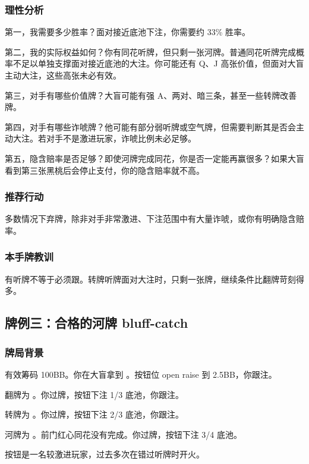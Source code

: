 \subsubsection*{理性分析}

第一，我需要多少胜率？面对接近底池下注，你需要约 33\% 胜率。

第二，我的实际权益如何？你有同花听牌，但只剩一张河牌。普通同花听牌完成概率不足以单独支撑面对接近底池的大注。你可能还有 Q、J 高张价值，但面对大盲主动大注，这些高张未必有效。

第三，对手有哪些价值牌？大盲可能有强 A、两对、暗三条，甚至一些转牌改善牌。

第四，对手有哪些诈唬牌？他可能有部分弱听牌或空气牌，但需要判断其是否会主动大注。若对手不是激进玩家，诈唬比例未必足够。

第五，隐含赔率是否足够？即使河牌完成同花，你是否一定能再赢很多？如果大盲看到第三张黑桃后会停止支付，你的隐含赔率就不高。

\subsubsection*{推荐行动}

多数情况下弃牌，除非对手非常激进、下注范围中有大量诈唬，或你有明确隐含赔率。

\subsubsection*{本手牌教训}

有听牌不等于必须跟。转牌听牌面对大注时，只剩一张牌，继续条件比翻牌苛刻得多。

\subsection{牌例三：合格的河牌 bluff-catch}

\subsubsection*{牌局背景}

有效筹码 100BB。你在大盲拿到 。按钮位 open raise 到 2.5BB，你跟注。

翻牌为 。你过牌，按钮下注 1/3 底池，你跟注。

转牌为 。你过牌，按钮下注 2/3 底池，你跟注。

河牌为 。前门红心同花没有完成。你过牌，按钮下注 3/4 底池。

按钮是一名较激进玩家，过去多次在错过听牌时开火。

